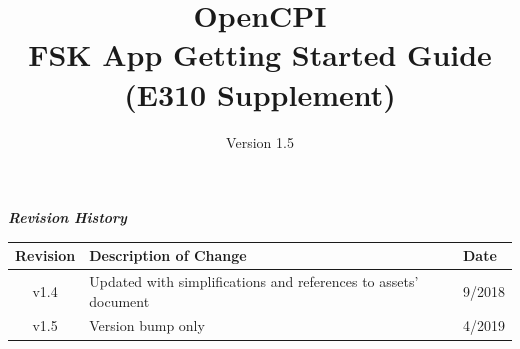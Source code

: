 \def\docTitle{OpenCPI\\ FSK App Getting Started Guide\\ (E310 Supplement)}
\def\docVersion{1.5}
\def\snippetpath{../../../../../../doc/av/tex/snippets}


\date{Version \docVersion} %
\title{\docTitle}
\usepackage[T1]{fontenc} %
\usepackage{graphicx}
\graphicspath{ {figures/} }
\usepackage{textcomp}

\maketitle
\newpage

	\begin{center}
	\textit{\textbf{Revision History}}
		\begin{table}[H]
		\label{table:revisions} %
			\begin{tabularx}{\textwidth}{|c|X|l|}
			\hline
			\rowcolor{blue}
			\textbf{Revision} & \textbf{Description of Change} & \textbf{Date} \\
		    \hline
			v1.4 & Updated with simplifications and references to assets' document & 9/2018 \\
			\hline
			v1.5 & Version bump only & 4/2019 \\
			\hline
			\end{tabularx}
		\end{table}
	\end{center}

